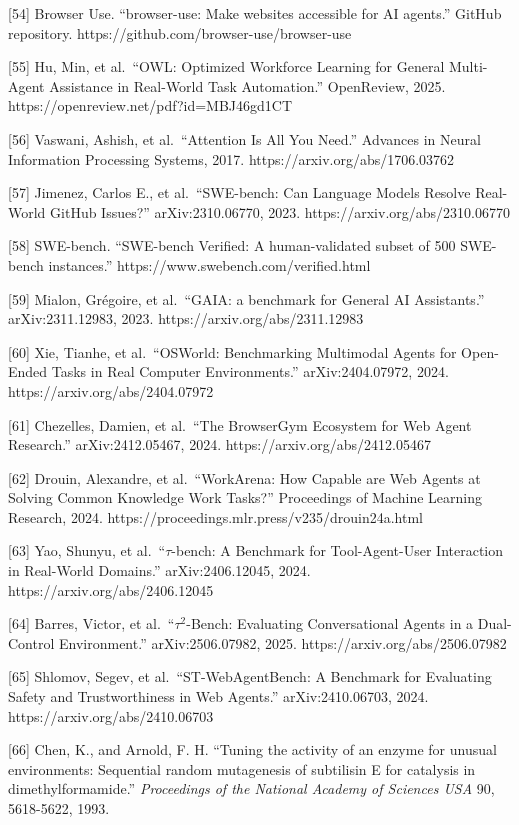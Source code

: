 {[}54{]} Browser Use. ``browser-use: Make websites accessible for AI
agents.'' GitHub repository. https://github.com/browser-use/browser-use

{[}55{]} Hu, Min, et al.~``OWL: Optimized Workforce Learning for General
Multi-Agent Assistance in Real-World Task Automation.'' OpenReview,
2025. https://openreview.net/pdf?id=MBJ46gd1CT

{[}56{]} Vaswani, Ashish, et al.~``Attention Is All You Need.'' Advances
in Neural Information Processing Systems, 2017.
https://arxiv.org/abs/1706.03762

{[}57{]} Jimenez, Carlos E., et al.~``SWE-bench: Can Language Models
Resolve Real-World GitHub Issues?'' arXiv:2310.06770, 2023.
https://arxiv.org/abs/2310.06770

{[}58{]} SWE-bench. ``SWE-bench Verified: A human-validated subset of
500 SWE-bench instances.'' https://www.swebench.com/verified.html

{[}59{]} Mialon, Grégoire, et al.~``GAIA: a benchmark for General AI
Assistants.'' arXiv:2311.12983, 2023. https://arxiv.org/abs/2311.12983

{[}60{]} Xie, Tianhe, et al.~``OSWorld: Benchmarking Multimodal Agents
for Open-Ended Tasks in Real Computer Environments.'' arXiv:2404.07972,
2024. https://arxiv.org/abs/2404.07972

{[}61{]} Chezelles, Damien, et al.~``The BrowserGym Ecosystem for Web
Agent Research.'' arXiv:2412.05467, 2024.
https://arxiv.org/abs/2412.05467

{[}62{]} Drouin, Alexandre, et al.~``WorkArena: How Capable are Web
Agents at Solving Common Knowledge Work Tasks?'' Proceedings of Machine
Learning Research, 2024.
https://proceedings.mlr.press/v235/drouin24a.html

{[}63{]} Yao, Shunyu, et al.~``\(\tau\)-bench: A Benchmark for
Tool-Agent-User Interaction in Real-World Domains.'' arXiv:2406.12045,
2024. https://arxiv.org/abs/2406.12045

{[}64{]} Barres, Victor, et al.~``\(\tau^2\)-Bench: Evaluating
Conversational Agents in a Dual-Control Environment.'' arXiv:2506.07982,
2025. https://arxiv.org/abs/2506.07982

{[}65{]} Shlomov, Segev, et al.~``ST-WebAgentBench: A Benchmark for
Evaluating Safety and Trustworthiness in Web Agents.'' arXiv:2410.06703,
2024. https://arxiv.org/abs/2410.06703

{[}66{]} Chen, K., and Arnold, F. H. ``Tuning the activity of an enzyme
for unusual environments: Sequential random mutagenesis of subtilisin E
for catalysis in dimethylformamide.'' \emph{Proceedings of the National
Academy of Sciences USA} 90, 5618-5622, 1993.

